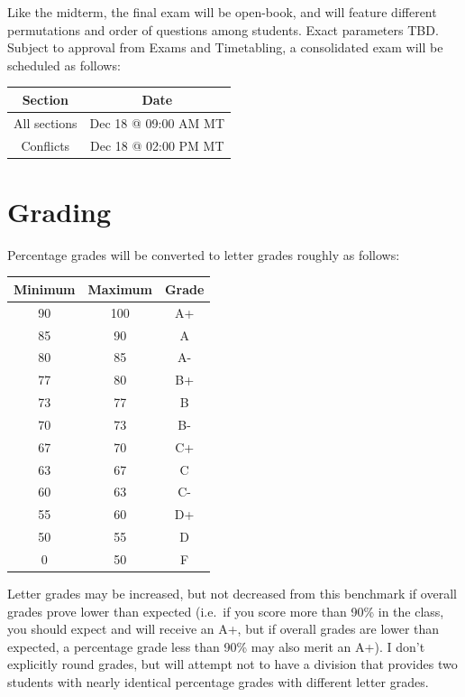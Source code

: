 \documentclass[11pt,]{article}
\begin{document}
Like the midterm, the final exam will be open-book, and will feature
different permutations and order of questions among students. Exact
parameters TBD. Subject to approval from Exams and Timetabling, a
consolidated exam will be scheduled as follows:

\begin{table}[!h]
\centering
\begin{tabular}{cc}
\toprule
Section & Date\\
\midrule
All sections & Dec 18 @ 09:00 AM MT\\
Conflicts & Dec 18 @ 02:00 PM MT\\
\bottomrule
\end{tabular}
\end{table}


\hypertarget{grading}{%
\section{Grading}\label{grading}}

Percentage grades will be converted to letter grades roughly as follows:

\begin{table}[!h]
\centering
\begin{tabular}{ccc}
\toprule
Minimum & Maximum & Grade\\
\midrule
90 & 100 & A+\\
85 & 90 & A\\
80 & 85 & A-\\
77 & 80 & B+\\
73 & 77 & B\\
70 & 73 & B-\\
67 & 70 & C+\\
63 & 67 & C\\
60 & 63 & C-\\
55 & 60 & D+\\
50 & 55 & D\\
0 & 50 & F\\
\bottomrule
\end{tabular}
\end{table}

Letter grades may be increased, but not decreased from this benchmark if
overall grades prove lower than expected (i.e.~if you score more than
90\% in the class, you should expect and will receive an A+, but if
overall grades are lower than expected, a percentage grade less than
90\% may also merit an A+). I don't explicitly round grades, but will
attempt not to have a division that provides two students with nearly
identical percentage grades with different letter grades.
\end{document}
